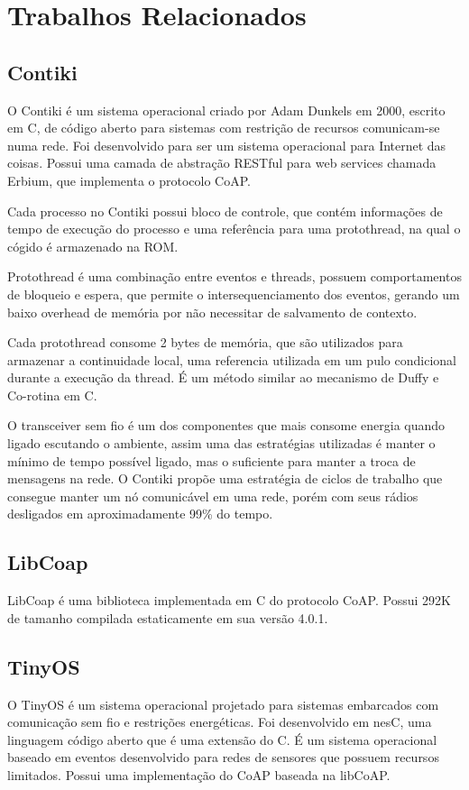 \section{Trabalhos Relacionados}

\subsection{Contiki}
O Contiki \'e um sistema operacional criado por Adam Dunkels em 2000, escrito em C, de c\'odigo aberto para sistemas com restri\c{c}\~ao de recursos comunicam-se numa rede. Foi desenvolvido para ser um sistema operacional para Internet das coisas. Possui uma camada de abstra\c{c}\~ao RESTful para web services chamada Erbium, que implementa o protocolo CoAP.

Cada processo no Contiki possui bloco de controle, que cont\'em informa\-\c{c}\~oes de tempo de execu\c{c}\~ao do processo e uma refer\^encia para uma protothread, na qual o c\'ogido \'e armazenado na ROM. 

Protothread \'e uma combina\c{c}\~ao entre eventos e threads, possuem comportamentos de bloqueio e espera, que permite o intersequenciamento dos eventos, gerando um baixo overhead de mem\'oria por n\~ao necessitar de salvamento de contexto.

Cada protothread consome 2 bytes de mem\'oria, que s\~ao utilizados para armazenar a continuidade local, uma referencia utilizada em um pulo condicional durante a execu\c{c}\~ao da thread. \'E um m\'etodo similar ao mecanismo de Duffy e Co-rotina em C. \cite{duffy}

O transceiver sem fio \'e um dos componentes que mais consome energia quando ligado escutando o ambiente, assim uma das estrat\'egias utilizadas \'e manter o m\'inimo de tempo poss\'ivel ligado, mas o suficiente para manter a troca de mensagens na rede. O Contiki prop\~oe uma estrat\'egia de ciclos de trabalho que consegue manter um n\'o comunic\'avel em uma rede, por\'em com seus r\'adios desligados em aproximadamente 99\% do tempo.

\subsection{LibCoap}
LibCoap \'e uma biblioteca implementada em C do protocolo CoAP. Possui 292K de tamanho compilada estaticamente em sua vers\~ao 4.0.1.


\subsection{TinyOS}
O TinyOS \'e um sistema operacional projetado para sistemas embarcados com comunica\c{c}\~ao sem fio e restri\c{c}\~oes energ\'eticas. Foi desenvolvido em nesC, uma linguagem c\'odigo aberto que \'e uma extens\~ao do C. \'E um sistema operacional baseado em eventos desenvolvido para redes de sensores que possuem recursos limitados. Possui uma implementa\c{c}\~ao do CoAP baseada na libCoAP.
